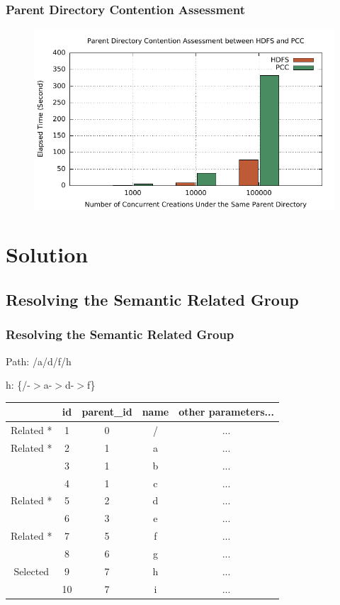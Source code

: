 \documentclass{beamer}
\begin{document}
\begin{frame}
	\frametitle{Parent Directory Contention Assessment}
	\begin{figure}[h]
		\centering
		\includegraphics[width=\linewidth]{figs/hdfs_pcc_parentlock.pdf}
	\end{figure}
\end{frame}

\section{Solution}
\subsection{Resolving the Semantic Related Group}
\begin{frame}
	\frametitle{Resolving the Semantic Related Group}
	\begin{block}{Path: /a/d/f/h}
		\begin{center}
			h: \{/-$>$a-$>$d-$>$f\}
		\end{center}
	\end{block}
	\begin{table}[h]
		\centering
		\begin{tabular}{|c|c|c|c|c|}
			\hline
			~ & \textbf{id} & \textbf{parent\_id} & \textbf{name} & \textbf{other parameters...} \\ \hline
			Related * & 1 & 0 & / & ... \\ \hline
			Related * & 2 & 1 & a & ... \\ \hline
			~ & 3 & 1 & b & ... \\ \hline
			~ & 4 & 1 & c & ... \\ \hline
			Related * & 5 & 2 & d & ... \\ \hline
			~ & 6 & 3 & e & ... \\ \hline
			Related * & 7 & 5 & f & ... \\ \hline
			~ & 8 & 6 & g & ... \\ \hline
			Selected \checkmark & 9 & 7 & h & ... \\ \hline
			~ & 10 & 7 & i & ... \\ \hline
		\end{tabular}
	\end{table}
\end{frame}
\end{document}
